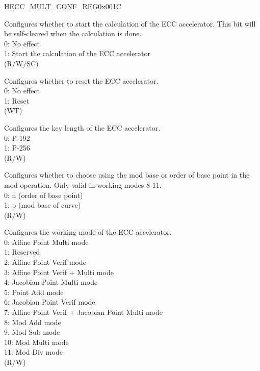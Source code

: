 \begin{register}{H}{ECC\_MULT\_CONF\_REG}{0x001C}\label{regdesc:ECCMULTCONFREG}
%
%
%
%
%
%
%
%
\regnewline%
\begin{regdesc}\begin{reglist}
\label{fielddesc:ECCMULTSTART}\item [ECC\_MULT\_START] Configures whether to start the calculation of the ECC accelerator. This bit will be self-cleared when the calculation is done. \\
0: No effect\\
1: Start the calculation of the ECC accelerator\\
(R/W/SC)
\label{fielddesc:ECCMULTRESET}\item [ECC\_MULT\_RESET] Configures whether to reset the ECC accelerator. \\
0: No effect\\
1: Reset\\
(WT)
\label{fielddesc:ECCMULTKEYLENGTH}\item [ECC\_MULT\_KEY\_LENGTH] Configures the key length of the ECC accelerator. \\
0: P-192\\
1: P-256\\
(R/W)
\label{fielddesc:ECCMULTMODBASE}\item [ECC\_MULT\_MOD\_BASE] Configures whether to choose using the mod base or order of base point in the mod operation. Only valid in working modes 8-11. \\
0: n (order of base point)\\
1: p (mod base of curve)\\
(R/W)
\label{fielddesc:ECCMULTWORKMODE}\item [ECC\_MULT\_WORK\_MODE] Configures the working mode of the ECC accelerator.\\
0: Affine Point Multi mode\\
1: Reserved\\
2: Affine Point Verif mode\\
3: Affine Point Verif + Multi mode\\
4: Jacobian Point Multi mode\\
5: Point Add mode\\
6: Jacobian Point Verif mode\\
7: Affine Point Verif + Jacobian Point Multi mode\\
8: Mod Add mode\\
9. Mod Sub mode\\
10: Mod Multi mode\\
11: Mod Div mode\\ 
(R/W)


\end{reglist}
\end{regdesc}
\end{register}
